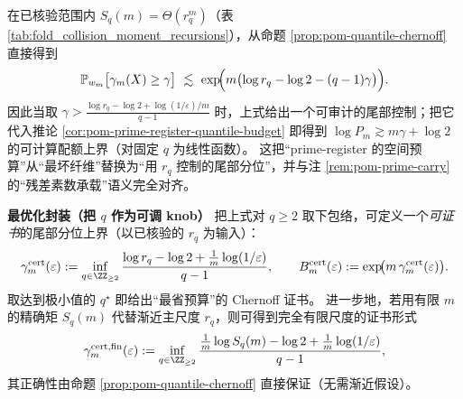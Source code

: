 
\begin{remark}\label{rem:pom-quantile-budget-computable}
在已核验范围内 \(S_q(m)=\Theta(r_q^m)\)（表 \ref{tab:fold_collision_moment_recursions}），从命题 \ref{prop:pom-quantile-chernoff} 直接得到
$$
\mathbb{P}_{w_m}\big[\gamma_m(X)\ge\gamma\big]\ \lesssim\
\exp\!\Bigl(m\bigl(\log r_q-\log 2-(q-1)\gamma\bigr)\Bigr).
$$
因此当取
\(
\gamma>\frac{\log r_q-\log 2+\log(1/\varepsilon)/m}{q-1}
\)
时，上式给出一个可审计的尾部控制；把它代入推论 \ref{cor:pom-prime-register-quantile-budget} 即得到
\(
\log P_m
\gtrsim
m\gamma+\log 2
\)
的可计算配额上界（对固定 \(q\) 为线性函数）。
这把“prime-register 的空间预算”从“最坏纤维”替换为“用 \(r_q\) 控制的尾部分位”，并与注 \ref{rem:pom-prime-carry} 的“残差素数承载”语义完全对齐。

\medskip\noindent\textbf{最优化封装（把 \(q\) 作为可调 knob）}
把上式对 \(q\ge 2\) 取下包络，可定义一个\emph{可证书}的尾部分位上界（以已核验的 \(r_q\) 为输入）：
\[
\gamma^{\mathrm{cert}}_m(\varepsilon)
:=\inf_{q\in\ZZ_{\ge 2}}
\frac{\log r_q-\log 2+\frac{1}{m}\log(1/\varepsilon)}{q-1},
\qquad
B^{\mathrm{cert}}_m(\varepsilon):=\exp\!\bigl(m\,\gamma^{\mathrm{cert}}_m(\varepsilon)\bigr).
\]
取达到极小值的 \(q^\star\) 即给出“最省预算”的 Chernoff 证书。
进一步地，若用有限 \(m\) 的精确矩 \(S_q(m)\) 代替渐近主尺度 \(r_q\)，则可得到完全有限尺度的证书形式
\[
\gamma^{\mathrm{cert,fin}}_m(\varepsilon)
:=\inf_{q\in\ZZ_{\ge 2}}
\frac{\frac{1}{m}\log S_q(m)-\log 2+\frac{1}{m}\log(1/\varepsilon)}{q-1},
\]
其正确性由命题 \ref{prop:pom-quantile-chernoff} 直接保证（无需渐近假设）。


\end{remark}
